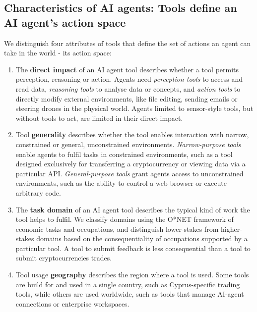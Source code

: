 \documentclass[manuscript,screen,nonacm,oneside]{acmart}
\begin{document}
\subsection{Characteristics of AI agents: Tools define an AI agent's action space}
\label{sec:characteristics}
We distinguish four attributes of tools that define the set of actions an agent can take in the world - its action space: 

\begin{enumerate}
\def\labelenumi{\arabic{enumi}.}
\item
  The \textbf{direct impact} of an AI agent tool describes whether a tool permits perception, reasoning or action. Agents need \emph{perception tools} to access and read data, \emph{reasoning tools} to analyse data or concepts, and \emph{action tools} to directly modify external environments, like file editing, sending emails or steering drones in the physical world. Agents limited to sensor-style tools, but without tools to act, are limited in their direct impact.

\item 
  Tool \textbf{generality} describes whether the tool enables interaction with narrow, constrained or general, unconstrained environments. \emph{Narrow-purpose tools} enable agents to fulfil tasks in constrained environments, such as a tool designed exclusively for transferring a cryptocurrency or viewing data via a particular API. \emph{General-purpose tools} grant agents access to unconstrained environments, such as the ability to control a web browser or execute arbitrary code. 

\item 
  The \textbf{task domain} of an AI agent tool describes the typical kind of work the tool helps to fulfil. We classify domains using the O*NET framework of economic tasks and occupations, and distinguish lower-stakes from higher-stakes domains based on the consequentiality of occupations supported by a particular tool. A tool to submit feedback is less consequential than a tool to submit cryptocurrencies trades. 

\item 
  Tool usage \textbf{geography} describes the region where a tool is used. Some tools are build for and used in a single country, such as Cyprus-specific trading tools, while others are used worldwide, such as tools that manage AI-agent connections or enterprise workspaces.
\end{enumerate}
\end{document}
